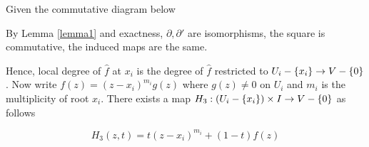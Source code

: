 \documentclass{article}
\begin{document}
\begin{center}
\end{center}

Given the commutative diagram below
\begin{center}
\end{center}

By Lemma \ref{lemma1} and exactness, $\partial, \partial'$ are isomorphisms, the square is commutative, the induced maps are the same.

\begin{center}
\end{center}

Hence, local degree of $\hat{f}$ at $x_i$ is the degree of $\hat{f}$ restricted to $U_i - \{x_i\} \to V - \{0\}$. Now write $f(z) = (z - x_i)^{m_i} g(z)$ where $g(z) \neq 0$ on $U_i$ and $m_i$ is the multiplicity of root $x_i$. There exists a map $H_3: (U_i - \{x_i\}) \times I \to V - \{0\}$ as follows

$$
    H_3(z, t) = t (z - x_i)^{m_i} + (1-t)f(z)
$$
\end{document}
